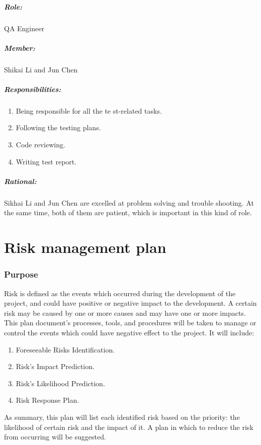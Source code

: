 \documentclass[11pt, a4paper]{report}
\begin{document}
\paragraph{Role: } QA Engineer
\paragraph{Member: } Shikai Li and Jun Chen
\paragraph{Responsibilities: }
\begin{enumerate}
	\item  Being responsible for all the te st-related tasks.
	\item  Following the testing plans.
	\item  Code reviewing.
	\item  Writing test report.
\end{enumerate}
\paragraph{Rational: \\}
Sikhai Li and Jun Chen are excelled at problem solving and trouble shooting. 
At the same time, both of them are patient, which is important in this kind of role.

\chapter{Risk management plan}
\subsection{Purpose}
Risk is defined as the events which occurred during the development of the project, and could have positive or negative impact to the development. A certain risk may be caused by one or more causes and may have one or more impacts. This plan document's processes, tools, and procedures will be taken to manage or control the events which could have negative effect to the project. It will include:
\begin{enumerate}
	\item Foreseeable Risks Identification.
	\item Risk's Impact Prediction.
	\item Risk's Likelihood Prediction.
	\item Risk Response Plan.
\end{enumerate}
As summary, this plan will list each identified risk based on the priority: the likelihood of certain risk and the impact of it. A plan in which to reduce the risk from occurring will be suggested.
\end{document}
